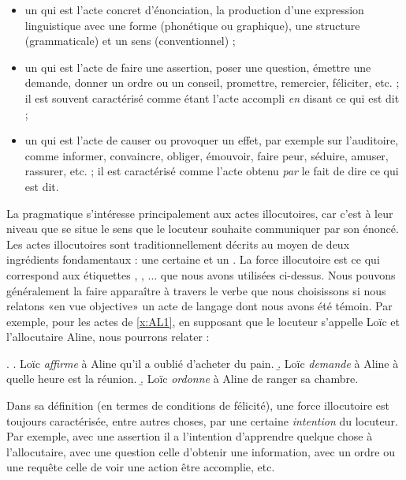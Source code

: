 \begin{refsegment}
\begin{itemize}
\item un  qui est l'acte concret d'énonciation, la production d'une expression linguistique avec une forme (phonétique ou graphique), une structure (grammaticale) et un sens (conventionnel) ;
\item un  qui est l'acte de faire une assertion, poser une question, émettre une demande, donner un ordre ou un conseil, promettre, remercier, féliciter, etc. ; il est souvent caractérisé comme étant l'acte accompli \emph{en} disant ce qui est dit ;
\item un  qui est l'acte de causer ou provoquer un effet, par exemple sur l'auditoire, comme informer, convaincre, obliger, émouvoir, faire peur, séduire, amuser, rassurer, etc. ; il est caractérisé comme l'acte obtenu \emph{par} le fait de dire ce qui est dit.
\end{itemize}

\smallskip

La pragmatique s'intéresse principalement aux actes illocutoires, car c'est à leur niveau que se situe le sens que le locuteur souhaite communiquer par son énoncé.  Les actes illocutoires sont traditionnellement décrits au moyen de deux ingrédients fondamentaux : une certaine  et un .  
La force illocutoire est ce qui correspond aux étiquettes , , ... que nous avons utilisées ci-dessus.  Nous pouvons généralement la faire apparaître à travers le verbe que nous choisissons si nous relatons «en vue objective» un acte de langage dont nous avons été témoin.  Par exemple, pour les actes de \ref{x:AL1}, en supposant que le locuteur s'appelle Loïc et l'allocutaire Aline, nous pourrons relater :

\ex. \label{x:AL2}
\a. Loïc \emph{affirme} à Aline qu'il a oublié d'acheter du pain.
\b. Loïc \emph{demande} à Aline à quelle heure est la réunion.
\b. Loïc \emph{ordonne} à Aline de ranger sa chambre.

Dans sa définition (en termes de conditions de félicité), une force illocutoire est toujours caractérisée, entre autres choses, par une certaine \emph{intention} du locuteur.  Par exemple, avec une assertion il a l'intention d'apprendre quelque chose à l'allocutaire, avec une question celle d'obtenir une information, avec un ordre ou une requête celle de voir une action être accomplie, etc.


\end{refsegment}
